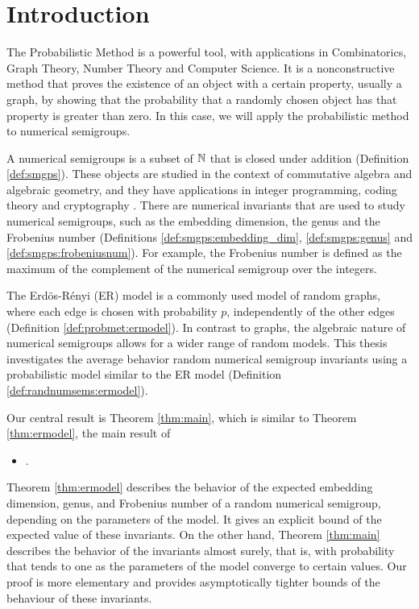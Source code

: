 \chapter{Introduction}\label{chap:intro}


The Probabilistic Method is a powerful tool, with applications in Combinatorics, Graph Theory, Number Theory and Computer Science. It is a nonconstructive method that proves the existence of an object with a certain property, usually a graph, by showing that the probability that a randomly chosen object has that property is greater than zero. In this case, we will apply the probabilistic method to numerical semigroups. \par

A numerical semigroups is a subset of $\mathbb{N}$ that is closed under addition (Definition \ref{def:smgps}). These objects are studied in the context of commutative algebra and algebraic geometry, and they have applications in integer programming, coding theory and cryptography \cite{assi2020numerical}. There are numerical invariants that are used to study numerical semigroups, such as the embedding dimension, the genus and the Frobenius number (Definitions \ref{def:smgps:embedding_dim}, \ref{def:smgps:genus} and \ref{def:smgps:frobeniusnum}). For example, the Frobenius number is defined as the maximum of the complement of the numerical semigroup over the integers. \par

The Erdös-Rényi (ER) model is a commonly used model of random graphs, where each edge is chosen with probability $p$, independently of the other edges (Definition \ref{def:probmet:ermodel}). In contrast to graphs, the algebraic nature of numerical semigroups allows for a wider range of random models. This thesis investigates the average behavior random numerical semigroup invariants using a probabilistic model similar to the ER model (Definition \ref{def:randnumsems:ermodel}).


Our central result is Theorem \ref{thm:main}, which is similar to Theorem \ref{thm:ermodel}, the main result of 
\begin{itemize}
    \item {}.
\end{itemize}
Theorem \ref{thm:ermodel} describes the behavior of the expected embedding dimension, genus, and Frobenius number of a random numerical semigroup, depending on the parameters of the model. It gives an explicit bound of the expected value of these invariants. On the other hand, Theorem \ref{thm:main} describes the behavior of the invariants almost surely, that is, with probability that tends to one as the parameters of the model converge to certain values. Our proof is more elementary and provides asymptotically tighter bounds of the behaviour of these invariants. 

